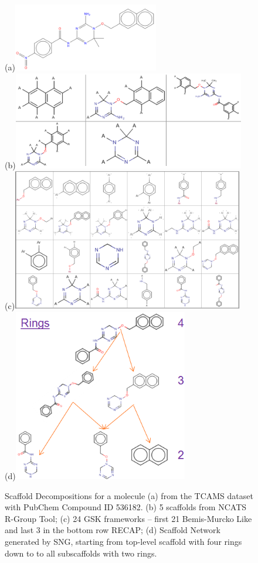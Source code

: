 \documentclass[journal=jacsat,manuscript=article]{achemso}
\begin{document}
\begin{figure}
(a)\includegraphics[width=2.5in]{fig/tcam1_mol.png}\\
(b)\includegraphics[width=4in]{fig/tcam1_RGscaf.png}\\
(c)\includegraphics[width=4in]{fig/tcam1_GSKframes.png}\\
(d)\includegraphics[width=3in]{fig/tcam1_SNG3.png}
\caption{Scaffold Decompositions for a molecule (a) from the TCAMS dataset with PubChem Compound ID 536182. (b) 5 scaffolds from NCATS R-Group Tool; (c) 24 GSK frameworks -- first 21 Bemis-Murcko Like and last 3 in the bottom row RECAP; (d) Scaffold Network generated by SNG, starting from top-level scaffold with four rings down to to all subscaffolds with two rings.}
\label{fig:scafmethod}
\end{figure}
\end{document}
